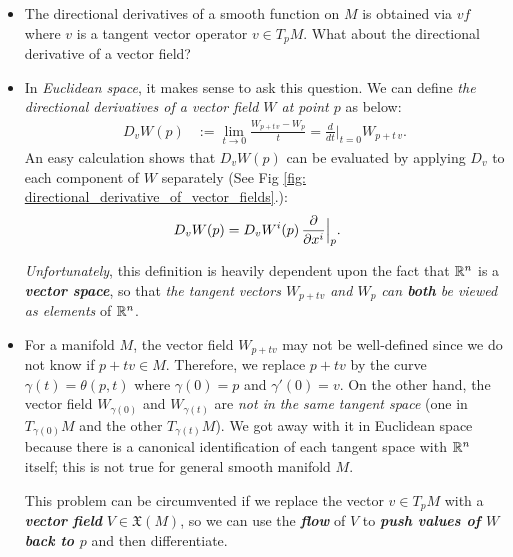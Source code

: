 \documentclass[11pt]{article}
\begin{document}
\begin{itemize}
\item The directional derivatives of a smooth function on $M$ is obtained via $vf$ where $v$ is a tangent vector operator $v\in T_pM$. What about the directional derivative of a vector field? 

\item \begin{remark}
In \emph{Euclidean space}, it makes sense to ask this question. We can define \emph{the directional derivatives of a vector field $W$ at point $p$} as below:
\begin{align*}
D_{v}W(p) &:=   \lim_{t\rightarrow 0} \frac{W_{p+ t\,v} - W_{p}}{t} = \frac{d}{dt}\Bigr|_{t=0}W_{p+t\,v}.
\end{align*} An easy calculation shows that $D_{v}W(p)$ can be evaluated by applying $D_v$ to each component of $W$ separately (See Fig \ref{fig: directional_derivative_of_vector_fields}.):
\begin{align*}
D_{v}W(p) &= D_{v}W^{i}(p)\,\frac{\partial }{ \partial x^{i}}\Bigr|_{p}.
\end{align*} 

\emph{Unfortunately}, this definition is heavily dependent upon the fact that ${\mathbb R}^n$ is a \emph{\textbf{vector space}}, so that \emph{the tangent vectors $W_{p+tv}$ and $W_p$ can \textbf{both} be viewed as elements} of ${\mathbb R}^{n}$.
\end{remark}

\item \begin{remark}
For a manifold $M$, the vector field $W_{p+tv}$ may not be well-defined since we do not know if $p+tv \in M$. Therefore, we replace $p + tv$ by the curve $\gamma(t)=\theta(p, t)$ where $\gamma(0) = p$ and $\gamma'(0) = v$. On the other hand, the vector field $W_{\gamma(0)}$ and $W_{\gamma(t)}$ are \emph{not in the same tangent space} (one in $T_{\gamma(0)}M$ and the other $T_{\gamma(t)}M$).  We got away with it in Euclidean space because there is a canonical identification
of each tangent space with ${\mathbb R}^n$ itself; this is not true for general smooth manifold $M$.

This problem can be circumvented if we replace the vector $v \in T_{p}M$ with a \emph{\textbf{vector field}} $V \in \mathfrak{X}(M)$, so we can use the \emph{\textbf{flow}} of $V$ to \emph{\textbf{push values of $W$ back to $p$}} and then differentiate.
\end{remark}



\end{itemize}
\end{document}
